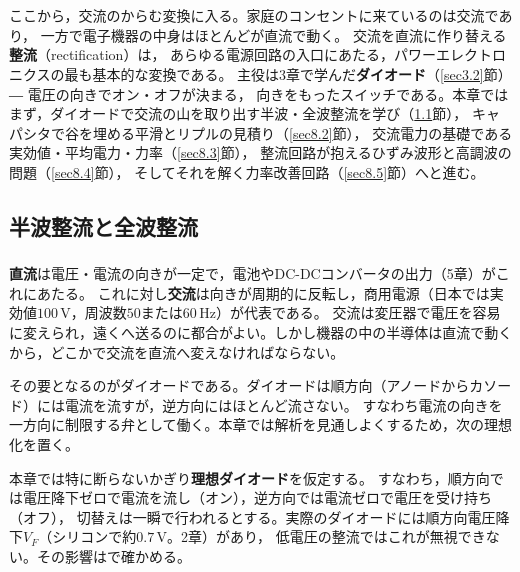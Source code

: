 \chapter{}
\label{chap8}

ここから，交流のからむ変換に入る。家庭のコンセントに来ているのは交流であり，
一方で電子機器の中身はほとんどが直流で動く。
交流を直流に作り替える\textbf{整流}（rectification）は，
あらゆる電源回路の入口にあたる，パワーエレクトロニクスの最も基本的な変換である。
主役は3章で学んだ\textbf{ダイオード}（\ref{sec3.2}節）― 電圧の向きでオン・オフが決まる，
向きをもったスイッチである。本章ではまず，ダイオードで交流の山を取り出す半波・全波整流を学び（\ref{sec8.1}節），
キャパシタで谷を埋める平滑とリプルの見積り（\ref{sec8.2}節），
交流電力の基礎である実効値・平均電力・力率（\ref{sec8.3}節），
整流回路が抱えるひずみ波形と高調波の問題（\ref{sec8.4}節），
そしてそれを解く力率改善回路（\ref{sec8.5}節）へと進む。

\section{半波整流と全波整流}
\label{sec8.1}

\subsection{}

\textbf{直流}は電圧・電流の向きが一定で，電池やDC-DCコンバータの出力（5章）がこれにあたる。
これに対し\textbf{交流}は向きが周期的に反転し，商用電源（日本では実効値$100$\,V，周波数$50$または$60$\,Hz）が代表である。
交流は変圧器で電圧を容易に変えられ，遠くへ送るのに都合がよい。しかし機器の中の半導体は直流で動くから，どこかで交流を直流へ変えなければならない。

その要となるのがダイオードである。ダイオードは順方向（アノードからカソード）には電流を流すが，逆方向にはほとんど流さない。
すなわち電流の向きを一方向に制限する弁として働く。本章では解析を見通しよくするため，次の理想化を置く。

\begin{注意}
本章では特に断らないかぎり\textbf{理想ダイオード}を仮定する。
すなわち，順方向では電圧降下ゼロで電流を流し（オン），逆方向では電流ゼロで電圧を受け持ち（オフ），
切替えは一瞬で行われるとする。実際のダイオードには順方向電圧降下$V_F$（シリコンで約$0.7$\,V。2章）があり，
低電圧の整流ではこれが無視できない。その影響はで確かめる。
\end{注意}

